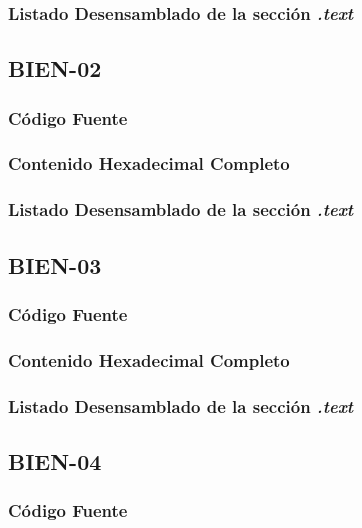 \documentclass[a4paper,12pt]{article}
\begin{document}
\subsubsection{Listado Desensamblado de la sección \textit{.text}}

\subsection{BIEN-02}
\subsubsection{Código Fuente}

\subsubsection{Contenido Hexadecimal Completo}
\subsubsection{Listado Desensamblado de la sección \textit{.text}}


\subsection{BIEN-03}
\subsubsection{Código Fuente}

\subsubsection{Contenido Hexadecimal Completo}
\subsubsection{Listado Desensamblado de la sección \textit{.text}}


\subsection{BIEN-04}
\subsubsection{Código Fuente}

\end{document}
